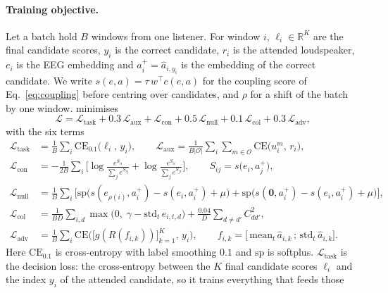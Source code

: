 \paragraph{Training objective.}
Let a batch hold $B$ windows from one listener. For window $i$, $\ell_i\in
\mathbb{R}^K$ are the final candidate scores, $y_i$ is the correct candidate,
$r_i$ is the attended loudspeaker, $e_i$ is the EEG embedding and
$a_i^{+}=\hat a_{i,y_i}$ is the embedding of the correct candidate. We write
$s(e,a)=\tau\,w^{\!\top}c(e,a)$ for the coupling score of Eq.~\ref{eq:coupling}
before centring over candidates, and $\rho$ for a shift of the batch by one
window. \merit{} minimises
\begin{equation}
  \mathcal{L}=\mathcal{L}_{\text{task}}
  +0.3\,\mathcal{L}_{\text{aux}}+\mathcal{L}_{\text{con}}
  +0.5\,\mathcal{L}_{\text{null}}+0.1\,\mathcal{L}_{\text{col}}
  +0.3\,\mathcal{L}_{\text{adv}},
  \label{eq:loss}
\end{equation}
with the six terms
\begin{align*}
  \mathcal{L}_{\text{task}} &= \tfrac1B\textstyle\sum_i
      \mathrm{CE}_{0.1}\big(\ell_i,\,y_i\big),
  \qquad
  \mathcal{L}_{\text{aux}} = \tfrac{1}{B|\mathcal{O}|}\textstyle\sum_i\sum_{m\in\mathcal{O}}
      \mathrm{CE}\big(u_i^m,\,r_i\big),\\
  \mathcal{L}_{\text{con}} &= -\tfrac{1}{2B}\textstyle\sum_i\Big[
      \log\frac{e^{S_{ii}}}{\sum_{j}e^{S_{ij}}}
      +\log\frac{e^{S_{ii}}}{\sum_{j}e^{S_{ji}}}\Big],
  \qquad S_{ij}=s\big(e_i,a_j^{+}\big),\\
  \mathcal{L}_{\text{null}} &= \tfrac1B\textstyle\sum_i\Big[
      \mathrm{sp}\big(s(e_{\rho(i)},a_i^{+})-s(e_i,a_i^{+})+\mu\big)
      +\mathrm{sp}\big(s(\mathbf{0},a_i^{+})-s(e_i,a_i^{+})+\mu\big)\Big],\\
  \mathcal{L}_{\text{col}} &= \tfrac{1}{BD}\textstyle\sum_{i,d}
      \max\big(0,\;\gamma-\mathrm{std}_t\,e_{i,t,d}\big)
      +\tfrac{0.04}{D}\textstyle\sum_{d\neq d'}C_{dd'}^2,\\
  \mathcal{L}_{\text{adv}} &= \tfrac1B\textstyle\sum_i
      \mathrm{CE}\big(\big[g(R(f_{i,k}))\big]_{k=1}^{K},\,y_i\big),
  \qquad f_{i,k}=\big[\,\mathrm{mean}_t\,\hat a_{i,k}\,;\,\mathrm{std}_t\,\hat a_{i,k}\big].
\end{align*}
Here $\mathrm{CE}_{0.1}$ is cross-entropy with label smoothing $0.1$ and
$\mathrm{sp}$ is softplus. $\mathcal{L}_{\text{task}}$ is the decision loss:
the cross-entropy between the $K$ final candidate scores $\ell_i$ and the index
$y_i$ of the attended candidate, so it trains everything that feeds those

